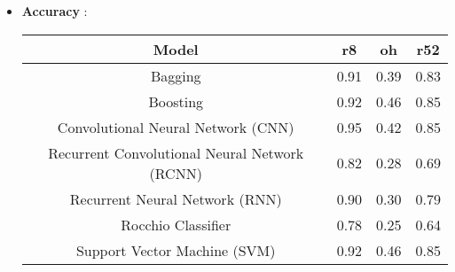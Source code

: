 \begin{itemize}
\begin{itemize}
        \newpage
        \item \textbf{Accuracy} :
            \newline
            \begin{tabular}{|c|c|c|c|}\hline
                Model & r8 & oh & r52 \\\hline
                Bagging & 0.91 & 0.39 & 0.83 \\\hline
                Boosting & 0.92 & 0.46 & 0.85 \\\hline
                Convolutional Neural Network (CNN) & 0.95 & 0.42 & 0.85 \\\hline
                Recurrent Convolutional Neural Network (RCNN) & 0.82 & 0.28 & 0.69 \\\hline
                Recurrent Neural Network (RNN) & 0.90 & 0.30 & 0.79 \\\hline
                Rocchio Classifier & 0.78 & 0.25 & 0.64 \\\hline
                Support Vector Machine (SVM) & 0.92 & 0.46 & 0.85 \\\hline
            \end{tabular}
    \end{itemize}    
\end{itemize}
